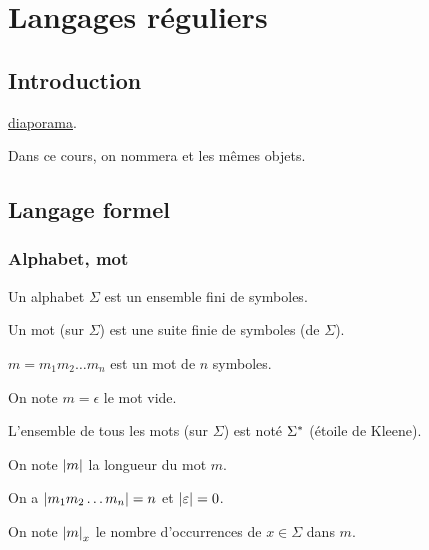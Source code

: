 \chapter{Langages réguliers}

\minitoc

\section*{Introduction}

\Cf \href{http://j.carcenac.info.free.fr/mpi/Diapo01_LANGAGES_slides.html#/}{diaporama}.

Dans ce cours, on nommera  et  les mêmes objets.

\section{Langage formel}

\subsection{Alphabet, mot}

\begin{defi}
Un alphabet \(\Sigma\) est un ensemble fini de symboles.

Un mot (sur \(\Sigma\)) est une suite finie de symboles (de \(\Sigma\)).
\end{defi}

\begin{ex}
\(m=m_1m_2\dots m_n\) est un mot de \(n\) symboles.

On note \(m=\epsilon\) le mot vide.
\end{ex}

\begin{nota}
L'ensemble de tous les mots (sur \(\Sigma\)) est noté \(\Sigma^{*}\) (étoile de Kleene).
\end{nota}

\begin{nota}
On note \(\left\lvert m\right\rvert\) la longueur du mot \(m\).
\end{nota}

\begin{prop}
On a \(\left\lvert m_1m_2\dots m_n\right\rvert=n\) et \(\left\lvert\varepsilon\right\rvert=0\).
\end{prop}

\begin{nota}
On note \(\left\lvert m\right\rvert_x\) le nombre d'occurrences de \(x\in\Sigma\) dans \(m\).
\end{nota}

